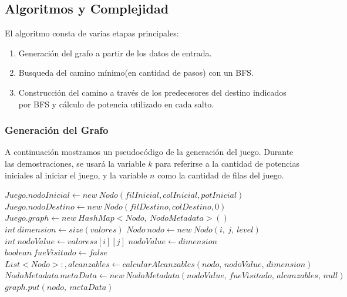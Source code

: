 \subsection{Algoritmos y Complejidad} \label{ej_3:algoritmo}
El algoritmo consta de varias etapas principales:
\begin{enumerate}
	\item Generaci\'on del grafo a partir de los datos de entrada.
	\item Busqueda del camino m\'inimo(en cantidad de pasos) con un BFS.
	\item Construcci\'on del camino a trav\'es de los predecesores del destino indicados por BFS y
 			c\'alculo de potencia utilizado en cada salto.
 \end{enumerate}

 \subsubsection{Generaci\'on del Grafo}

A continuaci\'on mostramos un pseudoc\'odigo de la generaci\'on del juego. Durante las demostraciones, se usar\'a la variable $k$ para referirse a la cantidad de potencias iniciales al iniciar el juego, y la variable $n$ como la cantidad de filas del juego.
\vspace{2mm}
\begin{algorithmic}[1]
\Statex
	\State $Juego.nodoInicial \gets new \: Nodo(filInicial, colInicial, potInicial)$
	\State $Juego.nodoDestino \gets new \: Nodo(filDestino, colDestino, 0) $
	\State $Juego.graph \gets new \: HashMap<Nodo,\: NodoMetadata>()$
	\State $int \: dimension \gets size(valores)$
				\State	$Nodo \: nodo\gets new \: Nodo(i,\: j,\: level)$
				\State	$int\: nodoValue \gets valoress[i][j]$
					\State $nodoValue \gets dimension$
				\EndIf
				\State	$boolean \:fueVisitado \gets false$
				\State	$List<Nodo>:, alcanzables \gets calcularAlcanzables(nodo,\, nodoValue,\, dimension)$
				\State	$NodoMetadata \, metaData \gets new\, NodoMetadata(nodoValue,\, fueVisitado,\, alcanzables,\, null)$
				\State	$graph.put(nodo,\: metaData)$
			\EndFor
		\EndFor
	\EndFor

\EndProcedure
\Statex
\end{algorithmic}
\vspace{2mm}


